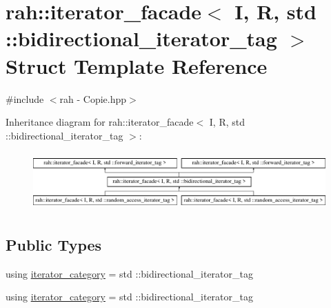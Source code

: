 \hypertarget{structrah_1_1iterator__facade_3_01_i_00_01_r_00_01std_01_1_1bidirectional__iterator__tag_01_4}{}\section{rah\+::iterator\+\_\+facade$<$ I, R, std \+::bidirectional\+\_\+iterator\+\_\+tag $>$ Struct Template Reference}
\label{structrah_1_1iterator__facade_3_01_i_00_01_r_00_01std_01_1_1bidirectional__iterator__tag_01_4}


{\ttfamily \#include $<$rah -\/ Copie.\+hpp$>$}

Inheritance diagram for rah\+::iterator\+\_\+facade$<$ I, R, std \+::bidirectional\+\_\+iterator\+\_\+tag $>$\+:\begin{figure}[H]
\begin{center}
\leavevmode
\includegraphics[height=2.264151cm]{structrah_1_1iterator__facade_3_01_i_00_01_r_00_01std_01_1_1bidirectional__iterator__tag_01_4}
\end{center}
\end{figure}
\subsection*{Public Types}
\begin{DoxyCompactItemize}
\item 
using \mbox{\hyperlink{structrah_1_1iterator__facade_3_01_i_00_01_r_00_01std_01_1_1bidirectional__iterator__tag_01_4_a2dbd37e6d8e7ce99205c0dc26c7a4fd2}{iterator\+\_\+category}} = std \+::bidirectional\+\_\+iterator\+\_\+tag
\item 
using \mbox{\hyperlink{structrah_1_1iterator__facade_3_01_i_00_01_r_00_01std_01_1_1bidirectional__iterator__tag_01_4_a2dbd37e6d8e7ce99205c0dc26c7a4fd2}{iterator\+\_\+category}} = std \+::bidirectional\+\_\+iterator\+\_\+tag
\end{DoxyCompactItemize}
